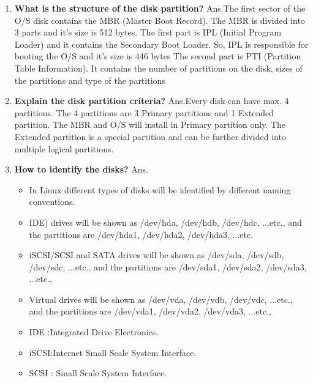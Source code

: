 \begin{enumerate}
\begin{enumerate}
  \bigskip
  \bigskip

  \item \textbf{What is the structure of the disk partition?}
  \newline
  Ans.The first sector of the O/S disk contains the MBR (Master Boot Record). The MBR is divided into 3 parts and it's size is 512 bytes. The first part is IPL (Initial Program Loader) and it contains the Secondary Boot Loader. So, IPL  is responsible for booting the O/S and it's size is 446 bytes The second part is PTI (Partition Table 
  Information). It contains the number of partitions on the disk, sizes of the partitions and type of the partitions

  \bigskip
  \bigskip

  \item \textbf{Explain the disk partition criteria?}
  \newline
  Ans.Every disk can have max. 4 partitions. The 4 partitions are 3 Primary partitions and 1 Extended partition.
  The MBR and O/S will install in Primary partition only. The Extended partition is a special partition and can be further divided into multiple logical partitions.
  
  \bigskip
  \bigskip

  \item \textbf{How to identify the disks?}
  \newline
  Ans.\begin{itemize}
         \item In Linux different types of disks will be identified by different naming conventions.
         \item IDE) drives will be shown as /dev/hda, /dev/hdb, /dev/hdc, ...etc.,  and the partitions are /dev/hda1,  /dev/hda2, /dev/hda3, ...etc.
         \item iSCSI/SCSI  and SATA drives will be shown as /dev/sda, /dev/sdb, /dev/sdc, ...etc.,  and the partitions are /dev/sda1, /dev/sda2, /dev/sda3, ...etc.,
         \item Virtual drives will be shown as /dev/vda, /dev/vdb, /dev/vdc, ...etc.,  and the partitions are /dev/vda1, /dev/vda2, /dev/vda3, ...etc.,
         \item IDE :Integrated Drive Electronics.
         \item iSCSI:Internet Small  Scale System Interface.
         \item SCSI : Small Scale System Interface.
      \end{itemize}
  

\end{enumerate}
\end{enumerate}
